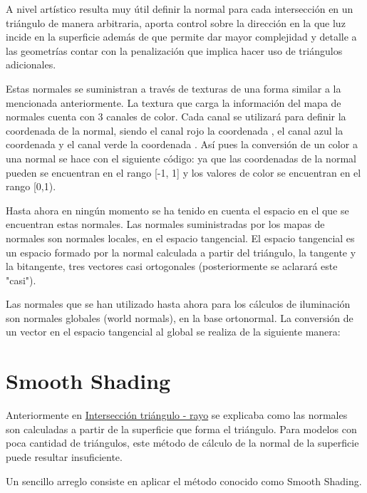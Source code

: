	A nivel artístico resulta muy útil definir la normal para cada intersección en un triángulo de manera arbitraria, aporta control sobre la dirección en la que luz incide en la superficie además de que permite dar mayor complejidad y detalle a las geometrías contar con la penalización que implica hacer uso de triángulos adicionales. 
	
	Estas normales se suministran a través de texturas de una forma similar a la mencionada anteriormente. La textura que carga la información del mapa de normales cuenta con 3 canales de color. Cada canal se utilizará para definir la coordenada de la normal, siendo el canal rojo la coordenada , el canal azul la coordenada  y el canal verde la coordenada . Así pues la conversión de un color a una normal se hace con el siguiente código:  ya que las coordenadas de la normal pueden se encuentran en el rango [-1, 1] y los valores de color se encuentran en el rango [0,1).
	
	Hasta ahora en ningún momento se ha tenido en cuenta el espacio en el que se encuentran estas normales. Las normales suministradas por los mapas de normales son normales locales, en el espacio tangencial. El espacio tangencial es un espacio formado por la normal calculada a partir del triángulo, la tangente y la bitangente, tres vectores casi ortogonales (posteriormente se aclarará este "casi").
	
	Las normales que se han utilizado hasta ahora para los cálculos de iluminación son normales globales (world normals), en la base ortonormal. La conversión de un vector en el espacio tangencial al global se realiza de la siguiente manera: 
	
	
	
	\section{Smooth Shading}
	
	Anteriormente en \hyperref[subsec:triintersection]{Intersección triángulo - rayo} se explicaba como las normales son calculadas a partir de la superficie que forma el triángulo. Para modelos con poca cantidad de triángulos, este método de cálculo de la normal de la superficie puede resultar insuficiente.
	
	Un sencillo arreglo consiste en aplicar el método conocido como Smooth Shading. 
	
